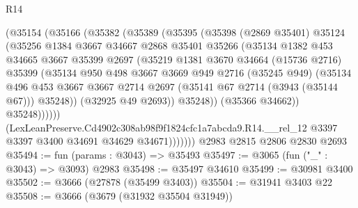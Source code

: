 \begin{lexlean}{R14}
\begin{coremodule}
                  (@35154
                    (@35166
                      (@35382
                        (@35389
                          (@35395
                            (@35398
                              (@2869 @35401)
                              @35124
                              (@35256
                                @1384
                                @3667
                                @34667
                                @2868
                                @35401
                                @35266
                                (@35134
                                  @1382
                                  @453
                                  @34665
                                  @3667
                                  @35399
                                  @2697
                                  (@35219
                                    @1381
                                    @3670
                                    @34664
                                    (@15736 @2716)
                                    @35399
                                    (@35134
                                      @950
                                      @498
                                      @3667
                                      @3669
                                      @949
                                      @2716
                                      (@35245 @949)
                                      (@35134
                                        @496
                                        @453
                                        @3667
                                        @3667
                                        @2714
                                        @2697
                                        (@35141 @67 @2714 (@3943 (@35144 @67)))
                                        @35248))
                                    (@32925 @49 @2693))
                                  @35248))
                              (@35366 @34662))
                            @35248))))))
                (LexLeanPreserve.Cd4902c308ab98f9f1824cfc1a7abcda9.R14.__rel_12
                  @3397
                  @3397
                  @3400
                  @34691
                  @34629
                  @34671)))))))
    @2983
    @2815
    @2806
    @2830
    @2693
@35494 := fun (params : @3043) => @35493
@35497 := @3065 (fun ("_" : @3043) => @3093) @2983
@35498 := @35497 @34610
@35499 := @30981 @3400
@35502 := @3666 (@27878 (@35499 @3403))
@35504 := @31941 @3403 @22
@35508 := @3666 (@3679 (@31932 @35504 @31949))

\end{coremodule}
\end{lexlean}
